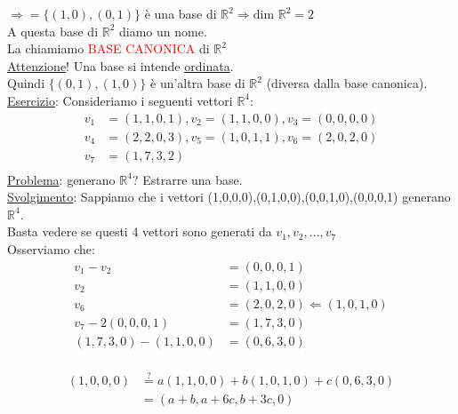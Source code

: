 $\Rightarrow = \{ (1,0),(0,1)\}$ è una base di $\mathbb{R}^2 \Rightarrow \text{dim } \mathbb{R}^2 = 2$\\

\textsf{\small A questa base di $\mathbb{R}^2$ diamo un nome.}\\
\textsf{\small La chiamiamo \textcolor{red}{BASE CANONICA} di $\mathbb{R}^2$}\\
\textsf{\small \underline{\underline{Attenzione}}! Una base si intende \underline{\underline{ordinata}}.}\\
\textsf{\small Quindi $\{ (0,1),(1,0)\}$ è un'altra base di $\mathbb{R}^2$ (diversa dalla base canonica).}\\

\textsf{\underline{Esercizio}: Consideriamo i seguenti vettori $\mathbb{R}^4$:}\\
\begin{align*}
	v_1 &= (1,1,0,1) , v_2 = (1,1,0,0) , v_3 = (0,0,0,0)\\
	v_4 &= (2,2,0,3) , v_5 = (1,0,1,1) , v_6 = (2,0,2,0)\\
	v_7 &= (1,7,3,2)\\
\end{align*}
\enlargethispage{1\linewidth}
\textsf{\small \underline{Problema}: generano $\mathbb{R}^4$? Estrarre una base.}\\
\textsf{\small \underline{Svolgimento}: Sappiamo che i vettori (1,0,0,0),(0,1,0,0),(0,0,1,0),(0,0,0,1) generano $\mathbb{R}^4$.}\\
\textsf{\small Basta vedere se questi 4 vettori sono generati da $v_1, v_2,\dots, v_7$}\\
\textsf{\small Osserviamo che:}
\begin{align*}
	v_1 - v_2 &= (0,0,0,1)\\
	v_2 &= (1,1,0,0)\\
	v_6 &= (2,0,2,0) \Leftarrow (1,0,1,0)\\
	v_7 - 2(0,0,0,1) &= (1,7,3,0)\\
	(1,7,3,0) - (1,1,0,0) &= (0,6,3,0)\\
\end{align*}

\newpage

\begin{align*}
	(1,0,0,0) &\overset{?}{=} a(1,1,0,0) + b(1,0,1,0) + c(0,6,3,0)\\
	&= (a + b, a + 6c, b + 3c, 0)\\
\end{align*}

